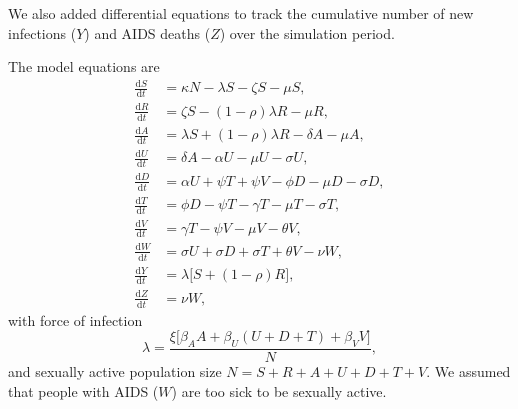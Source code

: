 \documentclass{article}
\newcommand{\md}{\mathrm{d}}
\begin{document}
We also added differential equations to track the cumulative number of
new infections ($Y$) and AIDS deaths ($Z$) over the simulation period.

The model equations are
\begin{equation}
  \label{model_eqns}
  \begin{split}
    \frac{\md S}{\md t} &= \kappa N - \lambda S - \zeta S- \mu S,
    \\
    \frac{\md R}{\md t} & = \zeta S - (1 - \rho) \lambda R - \mu R,
    \\
    \frac{\md A}{\md t} &= \lambda S + (1 - \rho) \lambda R - \delta A - \mu A,
    \\
    \frac{\md U}{\md t} &= \delta A - \alpha U - \mu U - \sigma U,
    \\
    \frac{\md D}{\md t} &=  \alpha U + \psi T + \psi V
    - \phi D - \mu D - \sigma D,
    \\
    \frac{\md T}{\md t} &= \phi D - \psi T - \gamma T - \mu T
    - \sigma T,
    \\
    \frac{\md V}{\md t} &= \gamma T - \psi V - \mu V - \theta V,
    \\
    \frac{\md W}{\md t} &= \sigma U + \sigma D + \sigma T + \theta V -
    \nu W,
    \\
    \frac{\md Y}{\md t} &= \lambda \big[S + (1 - \rho) R\big],
    \\
    \frac{\md Z}{\md t} &= \nu W,
  \end{split}
\end{equation}
with force of infection
\begin{equation}
  \label{force_of_infection}
  \lambda =
  \frac{\xi \big[\beta_A A + \beta_U (U + D + T) + \beta_V V\big]}{N},
\end{equation}
and sexually active population size $N = S + R + A + U + D + T + V$.
We assumed that people with AIDS ($W$) are too sick to be sexually
active.
\end{document}

